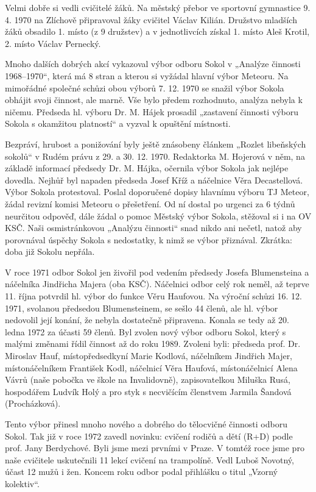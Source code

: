 Velmi dobře si vedli cvičitelé žáků. Na městský přebor ve sportovní
gymnastice 9. 4. 1970 na Zlíchově připravoval žáky cvičitel Václav
Kilián. Družstvo mladších žáků obsadilo 1. místo (z 9 družstev) a v
jednotlivcích získal 1. místo Aleš Krotil, 2. místo Václav Pernecký.

Mnoho dalších dobrých akcí vykazoval výbor odboru Sokol v „Analýze
činnosti 1968--1970``, která má 8 stran a kterou si vyžádal hlavní výbor
Meteoru. Na mimořádné společné schůzi obou výborů 7. 12. 1970 se snažil
výbor Sokola obhájit svoji činnost, ale marně. Vše bylo předem
rozhodnuto, analýza nebyla k ničemu. Předseda hl. výboru Dr. M. Hájek
prosadil „zastavení činnosti výboru Sokola s okamžitou platností`` a
vyzval k opuštění místnosti.

Bezpráví, hrubost a ponižování byly ještě znásobeny článkem „Rozlet
libeňských sokolů`` v Rudém právu z 29. a 30. 12. 1970. Redaktorka M.
Hojerová v něm, na základě informací předsedy Dr. M. Hájka, očernila
výbor Sokola jak nejlépe dovedla. Nejhůř byl napaden předseda Josef Kříž
a náčelnice Věra Decastellová. Výbor Sokola protestoval. Poslal
doporučené dopisy hlavnímu výboru TJ Meteor, žádal revizní komisi
Meteoru o přešetření. Od ní dostal po urgenci za 6 týdnů neurčitou
odpověď, dále žádal o pomoc Městský výbor Sokola, stěžoval si i na OV
KSČ. Naši osmistránkovou „Analýzu činnosti`` snad nikdo ani nečetl,
natož aby porovnával úspěchy Sokola s nedostatky, k nimž se výbor
přiznával. Zkrátka: doba již Sokolu nepřála.

V roce 1971 odbor Sokol jen živořil pod vedením předsedy Josefa
Blumensteina a náčelníka Jindřicha Majera (oba KSČ). Náčelnici odbor
celý rok neměl, až teprve 11. října potvrdil hl. výbor do funkce Věru
Haufovou. Na výroční schůzi 16. 12. 1971, svolanou předsedou
Blumensteinem, se sešlo 44 členů, ale hl. výbor nedovolil její konání,
že nebyla dostatečně připravena. Konala se tedy až 20. ledna 1972 za
účasti 59 členů. Byl zvolen nový výbor odboru Sokol, který s malými
změnami řídil činnost až do roku 1989. Zvoleni byli: předseda prof. Dr.
Miroslav Hauf, místopředsedkyní Marie Kodlová, náčelníkem Jindřich
Majer, místonáčelníkem František Kodl, náčelnicí Věra Haufová,
místonáčelnicí Alena Vávrů (naše pobočka ve škole na Invalidovně),
zapisovatelkou Miluška Rusá, hospodářem Ludvík Holý a pro styk s
necvičícím členstvem Jarmila Šandová (Procházková).

Tento výbor přinesl mnoho nového a dobrého do tělocvičné činnosti odboru
Sokol. Tak již v roce 1972 zavedl novinku: cvičení rodičů a dětí (R+D)
podle prof. Jany Berdychové. Byli jsme mezi prvními v Praze. V tomtéž
roce jsme pro naše cvičitele uskutečnili 11 lekcí cvičení na trampolíně.
Vedl Luboš Novotný, účast 12 mužů i žen. Koncem roku odbor podal
přihlášku o titul „Vzorný kolektiv``.

